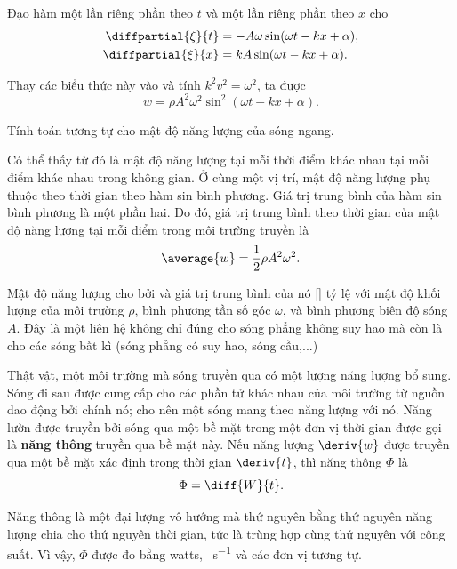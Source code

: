 Đạo hàm  một lần riêng phần theo $t$ và một lần riêng phần theo $x$ cho
\begin{align*}
	\diffpartial{\xi}{t} &= - A\omega \sin(\omega t - kx + \alpha),\\
	\diffpartial{\xi}{x} &=  kA \sin(\omega t - kx + \alpha).
\end{align*}

\noindent
Thay các biểu thức này vào  và tính $k^2v^2=\omega^2$, ta được
\begin{equation}\label{eq:14_42}
	w = \rho A^2 \omega^2 \sin^2(\omega t - kx + \alpha).
\end{equation}

\noindent
Tính toán tương tự cho mật độ năng lượng của sóng ngang.

Có thể thấy từ  đó là mật độ năng lượng tại mỗi thời điểm khác nhau tại mỗi điểm khác nhau trong không gian. Ở cùng một vị trí, mật độ năng lượng phụ thuộc theo thời gian theo hàm sin bình phương. Giá trị trung bình của hàm sin bình phương là một phần hai. Do đó, giá trị trung bình theo thời gian của mật độ năng lượng tại mỗi điểm trong môi trường truyền là
\begin{equation}\label{eq:14_43}
	\average{w} = \frac{1}{2} \rho A^2 \omega^2.
\end{equation}

\noindent
Mật độ năng lượng cho bởi  và giá trị trung bình của nó [] tỷ lệ với mật độ khối lượng của môi trường $\rho$, bình phương tần số góc $\omega$, và bình phương biên độ sóng $A$. Đây là một liên hệ không chỉ đúng cho sóng phẳng không suy hao mà còn là cho các sóng bất kì (sóng phẳng có suy hao, sóng cầu,...)

Thật vật, một môi trường mà sóng truyền qua có một lượng năng lượng bổ sung. Sóng đi sau được cung cấp cho các phần tử khác nhau của môi trường từ nguồn dao động bởi chính nó; cho nên một sóng mang theo năng lượng với nó.
Năng lườn được truyền bởi sóng qua một bề mặt trong một đơn vị thời gian được gọi là \textbf{năng thông} truyền qua bề mặt này. Nếu năng lượng $\deriv{w}$ được truyền qua một bề mặt xác định trong thời gian $\deriv{t}$, thì năng thông $\Phi$ là
\begin{equation}\label{eq:14_44}
	\Phi = \diff{W}{t}.
\end{equation}

\noindent
Năng thông là một đại lượng vô hướng mà thứ nguyên bằng thứ nguyên năng lượng chia cho thứ nguyên thời gian, tức là trùng hợp cùng thứ nguyên với công suất. Vì vậy, $\Phi$ được đo bằng watts, \si{\erg\per\second} và các đơn vị tương tự.

